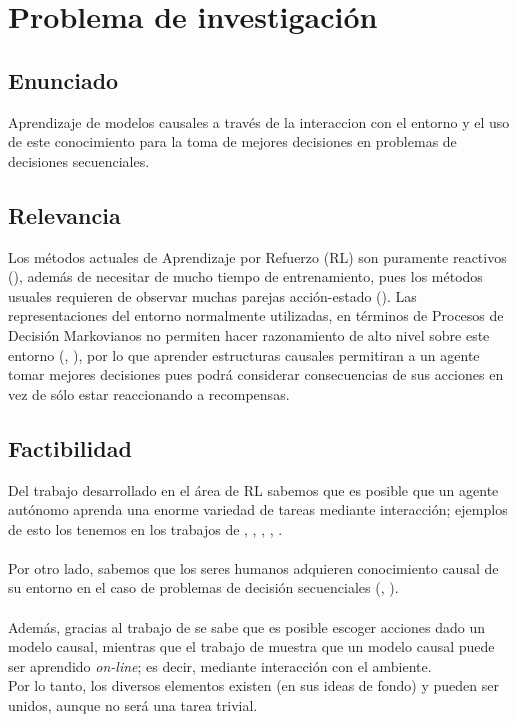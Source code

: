 \documentclass[11pt]{article}
\theoremstyle{plain}
\begin{document}
\section{Problema de investigación}
\subsection{Enunciado}
Aprendizaje de modelos causales a través de la interaccion con el entorno y el uso de este conocimiento para la toma de mejores decisiones en problemas de decisiones secuenciales.
\subsection{Relevancia}
Los métodos actuales de Aprendizaje por Refuerzo (RL) son puramente reactivos (\cite{garnelo2016towards}), además de necesitar de mucho tiempo de entrenamiento, pues los métodos usuales requieren de observar muchas parejas acción-estado (\cite{sutton1998reinforcement}). Las representaciones del entorno normalmente utilizadas, en términos de Procesos de Decisión Markovianos no permiten hacer razonamiento de alto nivel sobre este entorno (\cite{innes2018reasoning}, \cite{garnelo2016towards}), por lo que aprender estructuras causales permitiran a un agente tomar mejores decisiones pues podrá considerar consecuencias de sus acciones en vez de sólo estar reaccionando a recompensas.
\subsection{Factibilidad}
Del trabajo desarrollado en el área de RL sabemos que es posible que un agente autónomo aprenda una enorme variedad de tareas mediante interacción; ejemplos de esto los tenemos en los trabajos de \cite{mnih2013playing}, \cite{mnih2015human}, \cite{silver2016mastering}, \cite{silver2017mastering}, \cite{impala2018}. \\
\\
Por otro lado, sabemos que los seres humanos adquieren conocimiento causal de su entorno en el caso de problemas de decisión secuenciales (\cite{hagmayer2009decision}, \cite{hagmayer2013repeated}).\\
\\
Además, gracias al trabajo de \cite{lattimoreNIPS2016} se sabe que es posible escoger acciones dado un modelo causal, mientras que el trabajo de \cite{wellen2012learning} muestra que un modelo causal puede ser aprendido \textit{on-line}; es decir, mediante interacción con el ambiente. 
\\
Por lo tanto, los diversos elementos existen (en sus ideas de fondo) y pueden ser unidos, aunque no será una tarea trivial. 
\end{document}
